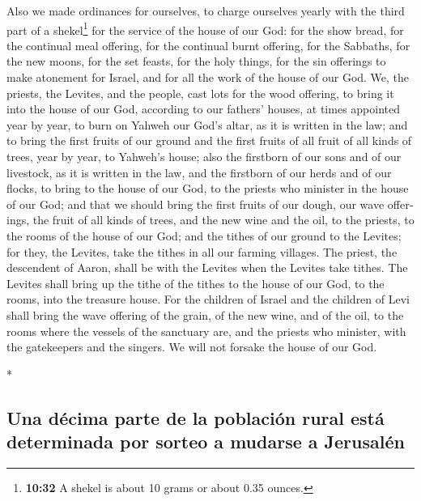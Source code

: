 \begin{paracol}{2}
\begin{otherlanguage}{english}
 Also we made ordinances for ourselves, to charge
ourselves yearly with the third part of a shekel\footnote{\textbf{10:32}
  A shekel is about 10 grams or about 0.35 ounces.} for the service of
the house of our God:  for the show bread, for the
continual meal offering, for the continual burnt offering, for the
Sabbaths, for the new moons, for the set feasts, for the holy things,
for the sin offerings to make atonement for Israel, and for all the work
of the house of our God.  We, the priests, the Levites,
and the people, cast lots for the wood offering, to bring it into the
house of our God, according to our fathers' houses, at times appointed
year by year, to burn on Yahweh our God's altar, as it is written in the
law;  and to bring the first fruits of our ground and the
first fruits of all fruit of all kinds of trees, year by year, to
Yahweh's house;  also the firstborn of our sons and of
our livestock, as it is written in the law, and the firstborn of our
herds and of our flocks, to bring to the house of our God, to the
priests who minister in the house of our God;  and that
we should bring the first fruits of our dough, our wave offerings, the
fruit of all kinds of trees, and the new wine and the oil, to the
priests, to the rooms of the house of our God; and the tithes of our
ground to the Levites; for they, the Levites, take the tithes in all our
farming villages.  The priest, the descendent of Aaron,
shall be with the Levites when the Levites take tithes. The Levites
shall bring up the tithe of the tithes to the house of our God, to the
rooms, into the treasure house.  For the children of
Israel and the children of Levi shall bring the wave offering of the
grain, of the new wine, and of the oil, to the rooms where the vessels
of the sanctuary are, and the priests who minister, with the gatekeepers
and the singers. We will not forsake the house of our God.

\end{otherlanguage}

\switchcolumn[0]*

\hypertarget{una-duxe9cima-parte-de-la-poblaciuxf3n-rural-estuxe1-determinada-por-sorteo-a-mudarse-a-jerusaluxe9n}{%
\subsection{Una décima parte de la población rural está determinada por
sorteo a mudarse a
Jerusalén}\label{una-duxe9cima-parte-de-la-poblaciuxf3n-rural-estuxe1-determinada-por-sorteo-a-mudarse-a-jerusaluxe9n}}


\end{paracol}
